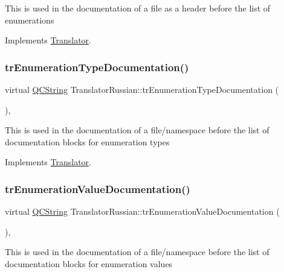 This is used in the documentation of a file as a header before the list of enumerations 

Implements \mbox{\hyperlink{class_translator}{Translator}}.

\mbox{\label{class_translator_russian_a8bc8f7e84f11c7808247dbab6dc2b023}} 
\subsubsection{\texorpdfstring{trEnumerationTypeDocumentation()}{trEnumerationTypeDocumentation()}}
{\footnotesize\ttfamily virtual \mbox{\hyperlink{class_q_c_string}{Q\+C\+String}} Translator\+Russian\+::tr\+Enumeration\+Type\+Documentation (\begin{DoxyParamCaption}{ }\end{DoxyParamCaption})\hspace{0.3cm}{\ttfamily [inline]}, {\ttfamily [virtual]}}

This is used in the documentation of a file/namespace before the list of documentation blocks for enumeration types 

Implements \mbox{\hyperlink{class_translator}{Translator}}.

\mbox{\label{class_translator_russian_a7c6f3b9297abb5877b0de6e9e6284fd8}} 
\subsubsection{\texorpdfstring{trEnumerationValueDocumentation()}{trEnumerationValueDocumentation()}}
{\footnotesize\ttfamily virtual \mbox{\hyperlink{class_q_c_string}{Q\+C\+String}} Translator\+Russian\+::tr\+Enumeration\+Value\+Documentation (\begin{DoxyParamCaption}{ }\end{DoxyParamCaption})\hspace{0.3cm}{\ttfamily [inline]}, {\ttfamily [virtual]}}

This is used in the documentation of a file/namespace before the list of documentation blocks for enumeration values 

